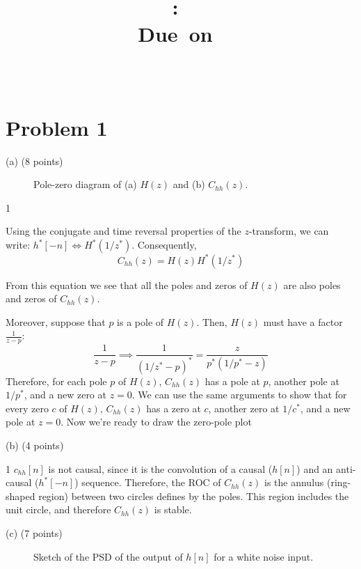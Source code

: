 \documentclass{article}
\title{
\vspace{2in}
\textmd{\textbf{\hmwkClass:\ \hmwkTitle}}\\
\normalsize\vspace{0.1in}\small{Due\ on\ \hmwkDueDate}\\
\vspace{0.1in}\large{\textit{\hmwkClassInstructor\ \hmwkClassTime}}
\vspace{3in}
}
\author{\textbf{\hmwkAuthorName}}
\date{} %
\def\SOLUTIONS{1} %
\def\SolutionsColor{red2}
\begin{document}
\section{Problem 1}
\begin{description}
\item{(a)} (8 points)
\begin{figure}[!h]
\centering
	\resizebox{\textwidth}{!}{}
    \caption{Pole-zero diagram of (a) $H(z)$ and (b) $C_{hh}(z)$.} \label{fig:pole-zero}
\end{figure}


\if\SOLUTIONS1
{\color{\SolutionsColor}
Using the conjugate and time reversal properties of the $z$-transform, we can write: $h^*[-n] \Longleftrightarrow H^*(1/z^*)$. Consequently,
\begin{equation*}
C_{hh}(z) = H(z)H^*(1/z^*)
\end{equation*}

From this equation we see that all the poles and zeros of $H(z)$ are also poles and zeros of $C_{hh}(z)$. 

Moreover, suppose that $p$ is a pole of $H(z)$. Then, $H(z)$ must have a factor $\frac{1}{z-p}$:
\begin{equation}
\frac{1}{z-p} \implies \frac{1}{(1/z^*-p)^*}  = \frac{z}{p^*(1/p^*-z)} 
\end{equation}
Therefore, for each pole $p$ of $H(z)$, $C_{hh}(z)$ has a pole at $p$,  another pole at $1/p^*$, and a new zero at $z = 0$. We can use the same arguments to show that for every zero $c$ of $H(z)$, $C_{hh}(z)$ has a zero at $c$, another zero at $1/c^*$, and a new pole at $z = 0$. Now we're ready to draw the zero-pole plot
}
\else\vspace{7cm}
\fi

\item{(b)} (4 points) 

\if\SOLUTIONS1
{\color{\SolutionsColor}
$c_{hh}[n]$ is not causal, since it is the convolution of a causal ($h[n]$) and an anti-causal ($h^*[-n]$) sequence. Therefore, the ROC of  $C_{hh}(z)$ is the annulus (ring-shaped region) between two circles defines by the poles.  This region includes the unit circle, and therefore $C_{hh}(z)$ is stable.
}
\else\vspace{3cm}
\fi




\item{(c)} (7 points) 
\begin{figure}[!h]
	\centering
	\resizebox{0.6\textwidth}{!}{}
    \caption{Sketch of the PSD of the output of $h[n]$ for a white noise input.} \label{fig:mag-resp}
\end{figure}


\end{description}
\end{document}
